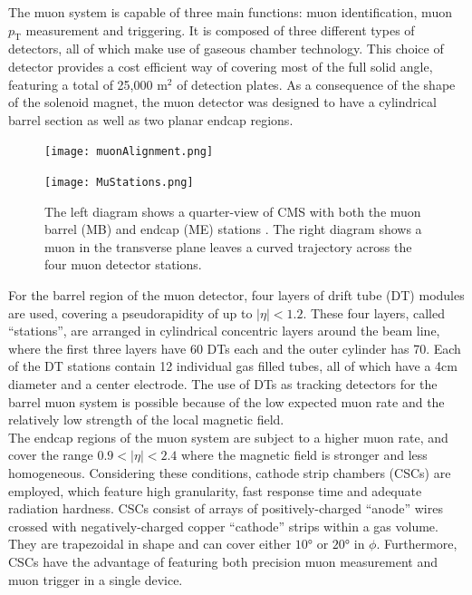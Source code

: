The muon system is capable of three main functions: muon identification, muon $p_{\text{T}}$ measurement and triggering. It is composed of three different types of detectors, all of which make use of gaseous chamber technology. This choice of detector provides a cost efficient way of covering most of the full solid angle, featuring a total of 25,000 m$^2$ of detection plates. As a consequence of the shape of the solenoid magnet, the muon detector was designed to have a cylindrical barrel section as well as two planar endcap regions.\\

\begin{figure}[H]
\begin{center}
\begin{minipage}[b]{0.59\textwidth}
\texttt{[image: muonAlignment.png]}
\end{minipage}
\hspace{1em}
\begin{minipage}[b]{0.3\textwidth}
    \texttt{[image: MuStations.png]}
\end{minipage}
\end{center}
\vspace{-1em}
\caption[Quarter-view of the CMS muon system (left) and a muon in the transverse plane leaves a curved trajectory across the four muon detector stations (right).]{The left diagram shows a quarter-view of CMS with both the muon barrel (MB) and endcap (ME) stations \cite{muonAlignment}.  The right diagram shows a muon in the transverse plane leaves a curved trajectory across the four muon detector stations\cite{MuDet}.}
\label{muonSystem}
\end{figure}

For the barrel region of the muon detector, four layers of drift tube (DT) modules are used, covering a pseudorapidity of up to $|\eta| < 1.2$. These four layers, called ``stations'', are arranged in cylindrical concentric layers around the beam line, where the first three layers have 60 DTs each and the outer cylinder has 70. Each of the DT stations contain 12 individual gas filled tubes, all of which have a 4cm diameter and a center electrode. The use of DTs as tracking detectors for the barrel muon system is possible because of the low expected muon rate and the relatively low strength of the local magnetic field.\\
 
The endcap regions of the muon system are subject to a higher muon rate, and cover the range $0.9 < |\eta| < 2.4$ where the magnetic field is stronger and less homogeneous. Considering these conditions, cathode strip chambers (CSCs) are employed, which feature high granularity, fast response time and adequate radiation hardness. CSCs consist of arrays of positively-charged ``anode'' wires crossed with negatively-charged copper ``cathode'' strips within a gas volume. They are trapezoidal in shape and can cover either $\ang{10}$ or $\ang{20}$ in $\phi$. Furthermore, CSCs have the advantage of featuring both precision muon measurement and muon trigger in a single device.\\

